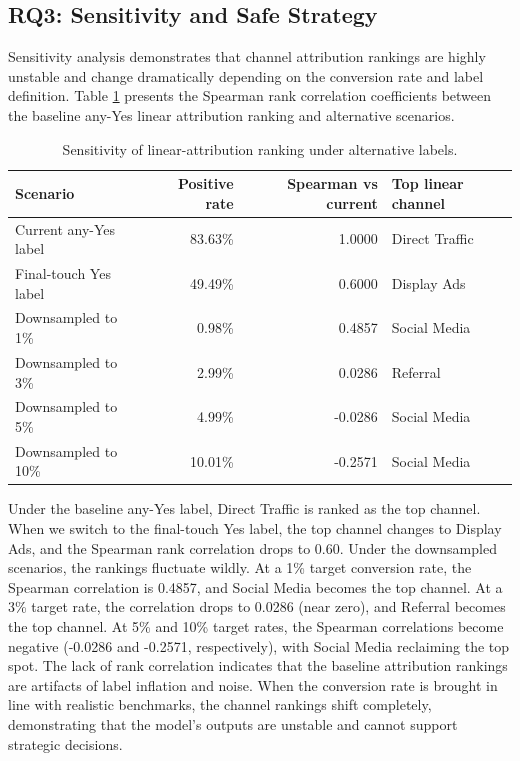 \documentclass[pdflatex,sn-basic,Numbered]{sn-jnl}
\begin{document}
\subsection{RQ3: Sensitivity and Safe Strategy}

Sensitivity analysis demonstrates that channel attribution rankings are highly unstable and change dramatically depending on the conversion rate and label definition. Table \ref{tab:sensitivity} presents the Spearman rank correlation coefficients between the baseline any-Yes linear attribution ranking and alternative scenarios.

\begin{table}[htbp]
\centering
\caption{Sensitivity of linear-attribution ranking under alternative labels.}
\label{tab:sensitivity}
\begin{tabular}{l r r l}
\toprule
Scenario & Positive rate & Spearman vs current & Top linear channel \\
\midrule
Current any-Yes label & 83.63\% & 1.0000 & Direct Traffic \\
Final-touch Yes label & 49.49\% & 0.6000 & Display Ads \\
Downsampled to 1\% & 0.98\% & 0.4857 & Social Media \\
Downsampled to 3\% & 2.99\% & 0.0286 & Referral \\
Downsampled to 5\% & 4.99\% & -0.0286 & Social Media \\
Downsampled to 10\% & 10.01\% & -0.2571 & Social Media \\
\bottomrule
\end{tabular}
\end{table}

Under the baseline any-Yes label, Direct Traffic is ranked as the top channel. When we switch to the final-touch Yes label, the top channel changes to Display Ads, and the Spearman rank correlation drops to 0.60. Under the downsampled scenarios, the rankings fluctuate wildly. At a 1\% target conversion rate, the Spearman correlation is 0.4857, and Social Media becomes the top channel. At a 3\% target rate, the correlation drops to 0.0286 (near zero), and Referral becomes the top channel. At 5\% and 10\% target rates, the Spearman correlations become negative (-0.0286 and -0.2571, respectively), with Social Media reclaiming the top spot. The lack of rank correlation indicates that the baseline attribution rankings are artifacts of label inflation and noise. When the conversion rate is brought in line with realistic benchmarks, the channel rankings shift completely, demonstrating that the model's outputs are unstable and cannot support strategic decisions.
\end{document}
